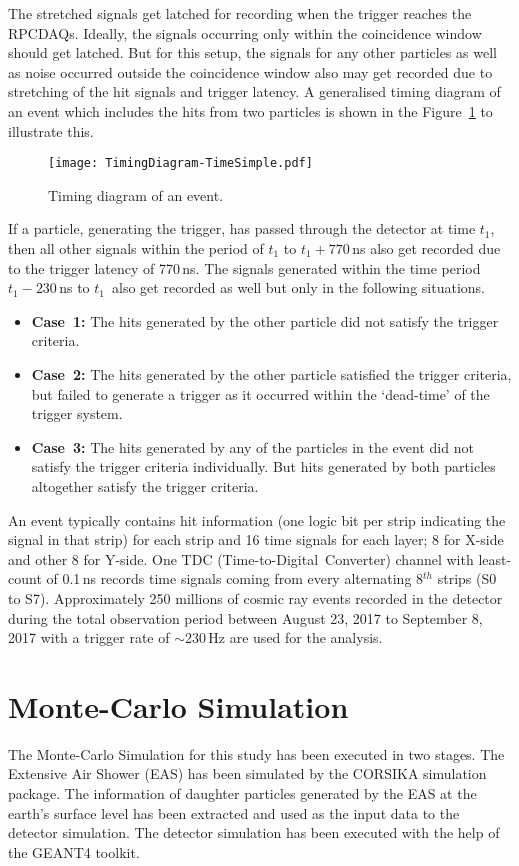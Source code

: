 The stretched signals get latched for recording when the trigger
reaches the RPCDAQs. Ideally, the signals occurring only within the
coincidence window should get latched. But for this setup, the signals
for any other particles as well as noise occurred outside the
coincidence window also may get recorded due to stretching of the hit
signals and trigger latency. A generalised timing diagram of an event
which includes the hits from two particles is shown in the
Figure~\ref{fig:timingdiagram} to illustrate this.
\begin{figure}[h]
  \texttt{[image: TimingDiagram-TimeSimple.pdf]} 
  \caption{Timing diagram of an event.}
  \label{fig:timingdiagram}
\end{figure}
If a particle, generating the trigger, has passed through the
detector at time $t_{1}$, then all other signals within the period of
$t_{1}$ to $t_{1}+770$\,ns also get recorded due to the trigger latency
of 770\,ns. The signals generated within the time period
$t_{1}-230$\,ns to $t_{1}$\ also get recorded as well but only in
the following situations.
\vspace*{-10pt}
\begin{itemize} \itemsep -5pt
\item \textbf{Case~1:} The hits generated by the other particle did
  not satisfy the trigger criteria.
\item \textbf{Case~2:} The hits generated by the other particle
  satisfied the trigger criteria, but failed to generate a trigger
  as it occurred within the `dead-time' of the trigger system.
\item \textbf{Case~3:} The hits generated by any of the particles in
  the event did not satisfy the trigger criteria individually.
  But hits generated by both particles altogether satisfy the trigger
  criteria.
\end{itemize}

An event typically contains hit information (one logic bit per strip
indicating the signal in that strip) for each strip and 16 time
signals for each layer; 8 for X-side and other 8 for Y-side.
One TDC (Time-to-Digital~Converter) channel with least-count of 0.1\,ns
records time signals coming from every alternating 8$^{th}$ strips
(S0 to S7). Approximately 250 millions of cosmic ray events
recorded in the detector during the total observation period between
August 23, 2017 to September 8, 2017 with a trigger rate of
$\sim$230\,Hz are used for the analysis.


\section{Monte-Carlo Simulation} \label{sec:montecarlo}
The Monte-Carlo Simulation for this study has been executed in
two stages. The Extensive Air Shower (EAS) has been simulated
by the CORSIKA simulation package\cite{corsika763}. The information
of daughter particles generated by the EAS at the earth's surface
level has been extracted and used as the input data to the detector
simulation. The detector simulation has been executed with the help
of the GEANT4 toolkit\cite{geant4}.


